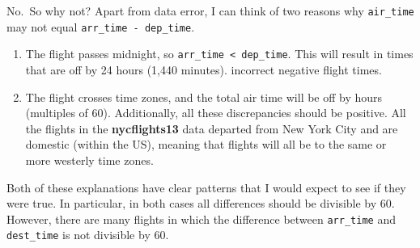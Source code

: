 \documentclass[]{book}
\newenvironment{Shaded}{\begin{snugshade}}{\end{snugshade}}
\newcommand{\CommentTok}[1]{\textcolor[rgb]{0.56,0.35,0.01}{\textit{#1}}}
\newcommand{\DecValTok}[1]{\textcolor[rgb]{0.00,0.00,0.81}{#1}}
\newcommand{\KeywordTok}[1]{\textcolor[rgb]{0.13,0.29,0.53}{\textbf{#1}}}
\newcommand{\NormalTok}[1]{#1}
\newcommand{\OperatorTok}[1]{\textcolor[rgb]{0.81,0.36,0.00}{\textbf{#1}}}
\newcommand{\StringTok}[1]{\textcolor[rgb]{0.31,0.60,0.02}{#1}}
\theoremstyle{plain}
\theoremstyle{remark}
\begin{document}
No.~So why not? Apart from data error, I can think of two reasons why \texttt{air\_time} may
not equal \texttt{arr\_time\ -\ dep\_time}.

\begin{enumerate}
\def\labelenumi{\arabic{enumi}.}
\item
  The flight passes midnight, so \texttt{arr\_time\ \textless{}\ dep\_time}. This will result in times that are off by 24 hours (1,440 minutes).
  incorrect negative flight times.
\item
  The flight crosses time zones, and the total air time will be off by hours (multiples of 60). Additionally, all these discrepancies should be positive.
  All the flights in the \textbf{nycflights13} data departed from New York City and are domestic (within the US), meaning that flights will all be to the same or more
  westerly time zones.
\end{enumerate}

Both of these explanations have clear patterns that I would expect to see if they
were true.
In particular, in both cases all differences should be divisible by 60.
However, there are many flights in which the difference between \texttt{arr\_time} and \texttt{dest\_time} is not divisible by 60.

\begin{Shaded}
\end{Shaded}
\end{document}
